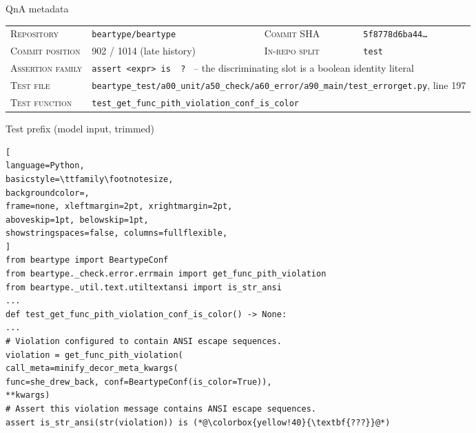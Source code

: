 \documentclass{llmxive}
\begin{document}
\begin{figure}[!htbp]
\begin{center}
\begin{tcolorbox}[
enhanced,
colback=white, colframe=qexHead, coltitle=white,
fonttitle=\bfseries,
title={Detailed qualitative example: \texttt{beartype/beartype} (IR test, commit-derived)},
arc=3pt, boxrule=0.6pt,
top=3pt, bottom=3pt, left=6pt, right=6pt,
]

\begin{qexsection}{QnA metadata}
\footnotesize
\begin{tabular}{@{}l@{\;\;}l@{\hskip 14pt}l@{\;\;}l@{}}
\textsc{Repository}      & \texttt{beartype/beartype}                  & \textsc{Commit SHA}        & \texttt{5f8778d6ba44\ldots} \\
\textsc{Commit position} & 902 / 1014 (late history)                   & \textsc{In-repo split}     & \texttt{test} \\
\textsc{Assertion family} & \multicolumn{3}{l}{\texttt{assert <expr> is \,?\,} -- the discriminating slot is a boolean identity literal} \\
\textsc{Test file}       & \multicolumn{3}{l}{\texttt{beartype\_test/a00\_unit/a50\_check/a60\_error/a90\_main/test\_errorget.py}, line 197} \\
\textsc{Test function}   & \multicolumn{3}{l}{\texttt{test\_get\_func\_pith\_violation\_conf\_is\_color}} \\
\end{tabular}
\end{qexsection}

\begin{qexsection}{Test prefix (model input, trimmed)}
\begin{lstlisting}[
language=Python,
basicstyle=\ttfamily\footnotesize,
backgroundcolor=,
frame=none, xleftmargin=2pt, xrightmargin=2pt,
aboveskip=1pt, belowskip=1pt,
showstringspaces=false, columns=fullflexible,
]
from beartype import BeartypeConf
from beartype._check.error.errmain import get_func_pith_violation
from beartype._util.text.utiltextansi import is_str_ansi
...
def test_get_func_pith_violation_conf_is_color() -> None:
...
# Violation configured to contain ANSI escape sequences.
violation = get_func_pith_violation(
call_meta=minify_decor_meta_kwargs(
func=she_drew_back, conf=BeartypeConf(is_color=True)),
**kwargs)
# Assert this violation message contains ANSI escape sequences.
assert is_str_ansi(str(violation)) is (*@\colorbox{yellow!40}{\textbf{???}}@*)
\end{lstlisting}
\end{qexsection}


\end{tcolorbox}
\end{center}
\end{figure}
\end{document}
